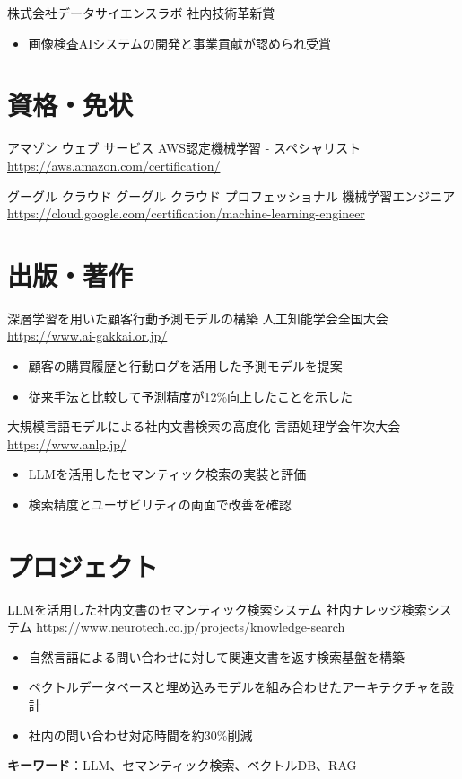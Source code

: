 \documentclass[a4paper, serif, 10pt]{moderncv}
\begin{document}
        {株式会社データサイエンスラボ}
        {社内技術革新賞}
        {}
        {}
        {\begin{itemize}
\item 画像検査AIシステムの開発と事業貢献が認められ受賞
\end{itemize}}
\section{資格・免状}

        {アマゾン ウェブ サービス}
        {AWS認定機械学習 - スペシャリスト}
        {\url{https://aws.amazon.com/certification/}}
        {}
        {}

        {グーグル クラウド}
        {グーグル クラウド プロフェッショナル 機械学習エンジニア}
        {\url{https://cloud.google.com/certification/machine-learning-engineer}}
        {}
        {}
\section{出版・著作}

        {深層学習を用いた顧客行動予測モデルの構築}
        {人工知能学会全国大会}
        {\url{https://www.ai-gakkai.or.jp/}}
        {}
        {\begin{itemize}
\item 顧客の購買履歴と行動ログを活用した予測モデルを提案
\item 従来手法と比較して予測精度が12\%向上したことを示した
\end{itemize}}

        {大規模言語モデルによる社内文書検索の高度化}
        {言語処理学会年次大会}
        {\url{https://www.anlp.jp/}}
        {}
        {\begin{itemize}
\item LLMを活用したセマンティック検索の実装と評価
\item 検索精度とユーザビリティの両面で改善を確認
\end{itemize}}
\section{プロジェクト}

        {LLMを活用した社内文書のセマンティック検索システム}
        {社内ナレッジ検索システム}
        {\url{https://www.neurotech.co.jp/projects/knowledge-search}}
        {}
        {\begin{itemize}
\item 自然言語による問い合わせに対して関連文書を返す検索基盤を構築
\item ベクトルデータベースと埋め込みモデルを組み合わせたアーキテクチャを設計
\item 社内の問い合わせ対応時間を約30\%削減
\end{itemize}
\textbf{キーワード}：LLM、セマンティック検索、ベクトルDB、RAG}
\end{document}
